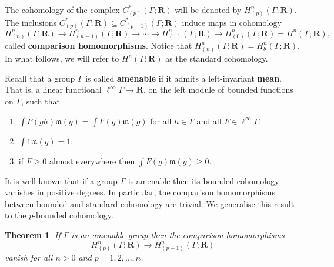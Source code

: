 \documentclass[12pt,reqno,a4paper]{amsart}
\renewcommand{\emph}[1]{{\bfseries\boldmath #1}}
\newtheorem{theorem}[subsection]{Theorem}%
\theoremstyle{definition}
\theoremstyle{remark}
\numberwithin{equation}{section}
\numberwithin{figure}{section}
\newcommand{\B}[1]{{\mathbf #1}}
\newcommand{\F}[1]{{\mathfrak #1}}
\begin{document}
The cohomology of the complex $C^*_{(p)}(\Gamma;\B R)$ 
will be denoted by $H^n_{(p)}(\Gamma;\B R)$.
The inclusions $C^*_{(p)}(\Gamma;\B R)\subseteq C^*_{(p-1)}(\Gamma;\B R)$
induce maps in cohomology 
$$
H^n_{(n)}(\Gamma;\B R)\to H^n_{(n-1)}(\Gamma;\B R)
\to \cdots \to H^n_{(1)}(\Gamma;\B R) \to H^n_{(0)}(\Gamma;\B R)=H^n(\Gamma;\B R),
$$
called  \emph{comparison homomorphisms}. 
Notice that $H^n_{(n)}(\Gamma;\B R)=H^n_b(\Gamma;\B R)$.
In what follows, we will refer to $H^n(\Gamma;\B R)$ as the standard cohomology. 

Recall that a group $\Gamma$ is called \emph{amenable} if 
it admits a left-invariant \emph{mean}. That is,
a linear functional $\ell^{\infty}\Gamma\to \B R$, on the left module
of bounded functions on $\Gamma$, such that
\begin{enumerate}
\item $\int F(gh)\F m(g) = \int F(g)\F m(g)$ for all $h\in \Gamma$ and 
all $F\in \ell^{\infty}\Gamma$;
\item $\int 1\F m(g) = 1$;
\item if $F\geq 0$ almost everywhere then $\int F(g)\F m(g)\geq 0$.
\end{enumerate}

It is well known \cite[Section 3.0]{zbMATH03816552} that if a group $\Gamma$ is
amenable then its bounded cohomology vanishes in positive degrees.  In
particular, the comparison homomorphisms between bounded and standard
cohomology are trivial. We generalise this result to the $p$-bounded
cohomology.

\begin{theorem}\label{T:comparison}
If\/ $\Gamma$ is an amenable group then the comparison homomorphisms
$$
H^n_{(p)}(\Gamma;\B R)\to H^n_{(p-1)}(\Gamma;\B R)
$$
vanish for all $n>0$ and $p=1,2,\dots, n$.
\end{theorem}
\end{document}
